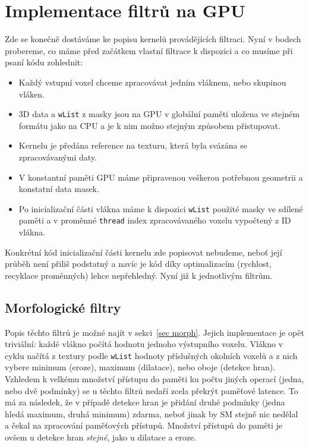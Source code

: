 \section{Implementace filtrů na GPU}

    Zde se konečně dostáváme ke popisu kernelů provádějících filtraci. Nyní v bodech probereme, co máme před začátkem vlastní filtrace k dispozici a co musíme při psaní kódu zohlednit:
    \begin{itemize}
      \item Každý vstupní voxel chceme zpracovávat jedním vláknem, nebo skupinou vláken.
      \item 3D data a {\tt wList} z masky jsou na GPU v globální paměti uložena ve stejném formátu jako na CPU a je k nim možno stejným způsobem přistupovat.
      \item Kernelu je předána reference na texturu, která byla svázána se zpracovávanými daty.
      \item V konstantní paměti GPU máme připravenou veškerou potřebnou geometrii a konstatní data masek.
      \item Po inicializační části vlákna máme k dispozici {\tt wList} použité masky ve sdílené paměti a v proměnné {\tt thread} index zpracovávaného voxelu vypočtený z ID vlákna.
    \end{itemize}

    Konkrétní kód inicializační části kernelu zde popisovat nebudeme, neboť její průběh není přiliš podstatný a navíc je kód díky optimalizacím (rychlost, recyklace proměnných) lehce nepřehledný. Nyní již k jednotlivým filtrům.

    \subsection{Morfologické filtry}

    Popis těchto filtrů je možné najít v sekci~\ref{sec morph}. Jejich implementace je opět triviální: každé vlákno počítá hodnotu jednoho výstupního voxelu. Vlákno v cyklu načítá z textury podle {\tt wList} hodnoty příslušných okolních voxelů a z nich vybere minimum (eroze), maximum (dilatace), nebo oboje (detekce hran). Vzhledem k velkému množství přístupu do paměti ku počtu jiných operací (jedna, nebo dvě podmínky) se u těchto filtrů nedaří zcela překrýt paměťové latence. To má za následek, že v případě detekce hran je přidání druhé podmínky (jedna hledá maximum, druhá minimum) \bq zdarma\eq, neboť jinak by SM stejně nic nedělal a čekal na zpracování paměťových přístupů. Množství přístupů do paměti je ovšem u detekce hran \emph{stejné}, jako u dilatace a eroze.

